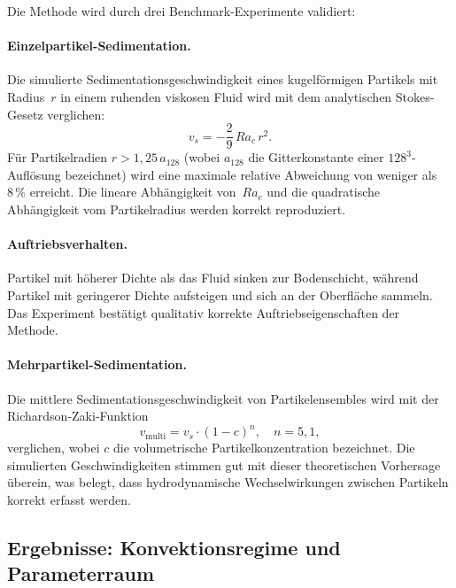 \documentclass[a4paper,12pt]{article}
\begin{document}
Die Methode wird durch drei Benchmark-Experimente validiert:

\paragraph{Einzelpartikel-Sedimentation.}
Die simulierte Sedimentationsgeschwindigkeit eines kugelförmigen Partikels mit
Radius~$r$ in einem ruhenden viskosen Fluid wird mit dem analytischen
Stokes-Gesetz verglichen:
\begin{equation}
    v_s = -\frac{2}{9}\,Ra_c\,r^2.
\end{equation}
F\"ur Partikelradien $r > 1{,}25\,a_{128}$ (wobei $a_{128}$ die Gitterkonstante
einer $128^3$-Aufl\"osung bezeichnet) wird eine maximale relative Abweichung
von weniger als $8\,\%$ erreicht. Die lineare Abh\"angigkeit von~$Ra_c$ und die
quadratische Abh\"angigkeit vom Partikelradius werden korrekt reproduziert.

\paragraph{Auftriebsverhalten.}
Partikel mit h\"oherer Dichte als das Fluid sinken zur Bodenschicht, w\"ahrend
Partikel mit geringerer Dichte aufsteigen und sich an der Oberfl\"ache sammeln.
Das Experiment best\"atigt qualitativ korrekte Auftriebseigenschaften der
Methode.

\paragraph{Mehrpartikel-Sedimentation.}
Die mittlere Sedimentationsgeschwindigkeit von Partikelensembles wird mit der
Richardson-Zaki-Funktion
\begin{equation}
    v_\mathrm{multi} = v_s \cdot (1-c)^n, \quad n = 5{,}1,
\end{equation}
verglichen, wobei $c$ die volumetrische Partikelkonzentration bezeichnet. Die
simulierten Geschwindigkeiten stimmen gut mit dieser theoretischen
Vorhersage \"uberein, was belegt, dass hydrodynamische Wechselwirkungen
zwischen Partikeln korrekt erfasst werden.

\subsection*{Ergebnisse: Konvektionsregime und Parameterraum}
\end{document}
